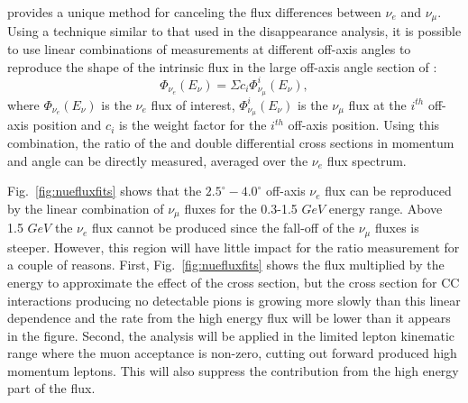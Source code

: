 \nuprismlite provides a unique method for canceling the flux differences between $\nu_e$ and $\nu_\mu$. Using a technique similar to that used in the \nuprismlite \numu disappearance analysis, it is possible to use linear combinations of \numu measurements at different off-axis angles to reproduce the shape of the intrinsic \nue flux in the large off-axis angle section of \nuprism:
\begin{equation}
\Phi_{\nu_e}(E_\nu) = \Sigma c_i \Phi^i_{\nu_\mu}(E_\nu),
\end{equation}
where $\Phi_{\nu_e}(E_\nu)$ is the \nuprism $\nu_e$ flux of interest, $\Phi^i_{\nu_\mu}(E_\nu) $ is the $\nu_\mu$ flux at the $i^{th}$ off-axis position and $c_i$ is the weight factor for the $i^{th}$ off-axis position. Using this combination, the ratio of the \nue and \numu double differential cross sections in momentum and angle can be directly measured, averaged over the $\nu_e$ flux spectrum.

Fig.~\ref{fig:nuefluxfits} shows that the \nuprism $2.5^{\circ}-4.0^{\circ}$ off-axis $\nu_e$ flux can be reproduced by the linear combination of $\nu_{\mu}$ fluxes for the 0.3-1.5 $GeV$ energy range.  Above 1.5 $GeV$ the $\nu_{e}$ flux cannot be produced since the fall-off of the $\nu_{\mu}$ fluxes is steeper.  However, this region will have little impact for the ratio measurement for a couple of reasons.  First, Fig.~\ref{fig:nuefluxfits} shows the flux multiplied by the energy to approximate the effect of the cross section, but the cross section for CC interactions producing no detectable pions is growing more slowly than this linear dependence and the rate from the high energy flux will be lower than it appears in the figure.  Second, the analysis will be applied in the limited lepton kinematic range where the \nuprism muon acceptance is non-zero, cutting out forward produced high momentum leptons.  This will also suppress the contribution from the high energy part of the flux.  

